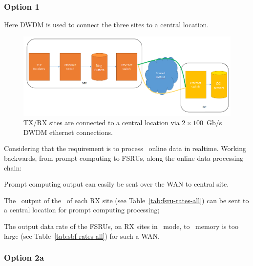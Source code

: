 \documentclass[12pt,a4paper]{article}
\begin{document}
\subsubsection{Option 1}
Here DWDM is used to connect the three \ED sites to a central location.
\label{sssec:option1}
\begin{figure}[h]
\centering
\includegraphics[width=\textwidth]{photon_option_1.png}
\caption{\ED TX/RX sites are connected to a central location via $2\times 100 $~Gb/s DWDM ethernet connections.\label{fig:option_1}
}
\end{figure}
Considering that the requirement is to process \NBW\ online data in realtime.
Working backwards, from prompt computing to FSRUs, along the online data processing chain:
\bitm
\item Prompt computing output can easily be sent over the WAN to central site.
\item The \NBW\ output of the \SBF\ of each RX site (see Table~\ref{tab:fsru-rates-all}) can be sent to a central location for prompt computing processing;
\item The output data rate of the FSRUs, on RX sites in \NBW\ mode, to \RB\ memory is too large (see Table~\ref{tab:sbf-rates-all}) for such a WAN.
\eitm

\subsubsection{Option 2a}
\label{sssec:option2a}
\end{document}
